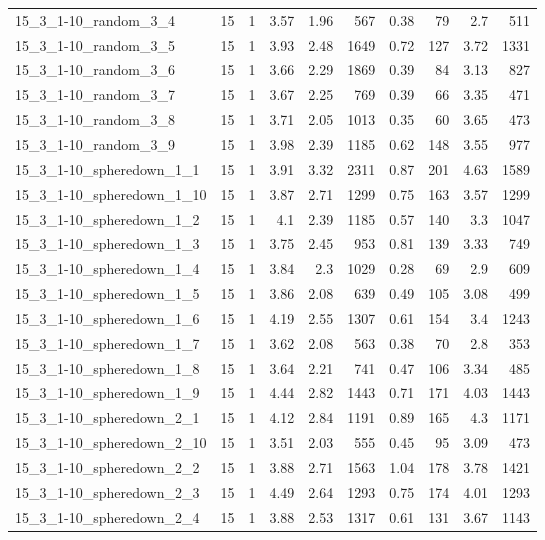 \begin{center}
\begin{scriptsize}
\begin{longtable}{lrrrrrrrrr}
15\_3\_1-10\_random\_3\_4 & 15 & 1 & 3.57 & 1.96 & 567 & 0.38 & 79 & 2.7 & 511\\
15\_3\_1-10\_random\_3\_5 & 15 & 1 & 3.93 & 2.48 & 1649 & 0.72 & 127 & 3.72 & 1331\\
15\_3\_1-10\_random\_3\_6 & 15 & 1 & 3.66 & 2.29 & 1869 & 0.39 & 84 & 3.13 & 827\\
15\_3\_1-10\_random\_3\_7 & 15 & 1 & 3.67 & 2.25 & 769 & 0.39 & 66 & 3.35 & 471\\
15\_3\_1-10\_random\_3\_8 & 15 & 1 & 3.71 & 2.05 & 1013 & 0.35 & 60 & 3.65 & 473\\
15\_3\_1-10\_random\_3\_9 & 15 & 1 & 3.98 & 2.39 & 1185 & 0.62 & 148 & 3.55 & 977\\
15\_3\_1-10\_spheredown\_1\_1 & 15 & 1 & 3.91 & 3.32 & 2311 & 0.87 & 201 & 4.63 & 1589\\
15\_3\_1-10\_spheredown\_1\_10 & 15 & 1 & 3.87 & 2.71 & 1299 & 0.75 & 163 & 3.57 & 1299\\
15\_3\_1-10\_spheredown\_1\_2 & 15 & 1 & 4.1 & 2.39 & 1185 & 0.57 & 140 & 3.3 & 1047\\
15\_3\_1-10\_spheredown\_1\_3 & 15 & 1 & 3.75 & 2.45 & 953 & 0.81 & 139 & 3.33 & 749\\
15\_3\_1-10\_spheredown\_1\_4 & 15 & 1 & 3.84 & 2.3 & 1029 & 0.28 & 69 & 2.9 & 609\\
15\_3\_1-10\_spheredown\_1\_5 & 15 & 1 & 3.86 & 2.08 & 639 & 0.49 & 105 & 3.08 & 499\\
15\_3\_1-10\_spheredown\_1\_6 & 15 & 1 & 4.19 & 2.55 & 1307 & 0.61 & 154 & 3.4 & 1243\\
15\_3\_1-10\_spheredown\_1\_7 & 15 & 1 & 3.62 & 2.08 & 563 & 0.38 & 70 & 2.8 & 353\\
15\_3\_1-10\_spheredown\_1\_8 & 15 & 1 & 3.64 & 2.21 & 741 & 0.47 & 106 & 3.34 & 485\\
15\_3\_1-10\_spheredown\_1\_9 & 15 & 1 & 4.44 & 2.82 & 1443 & 0.71 & 171 & 4.03 & 1443\\
15\_3\_1-10\_spheredown\_2\_1 & 15 & 1 & 4.12 & 2.84 & 1191 & 0.89 & 165 & 4.3 & 1171\\
15\_3\_1-10\_spheredown\_2\_10 & 15 & 1 & 3.51 & 2.03 & 555 & 0.45 & 95 & 3.09 & 473\\
15\_3\_1-10\_spheredown\_2\_2 & 15 & 1 & 3.88 & 2.71 & 1563 & 1.04 & 178 & 3.78 & 1421\\
15\_3\_1-10\_spheredown\_2\_3 & 15 & 1 & 4.49 & 2.64 & 1293 & 0.75 & 174 & 4.01 & 1293\\
15\_3\_1-10\_spheredown\_2\_4 & 15 & 1 & 3.88 & 2.53 & 1317 & 0.61 & 131 & 3.67 & 1143\\

\end{longtable}
\end{scriptsize}
\end{center}
